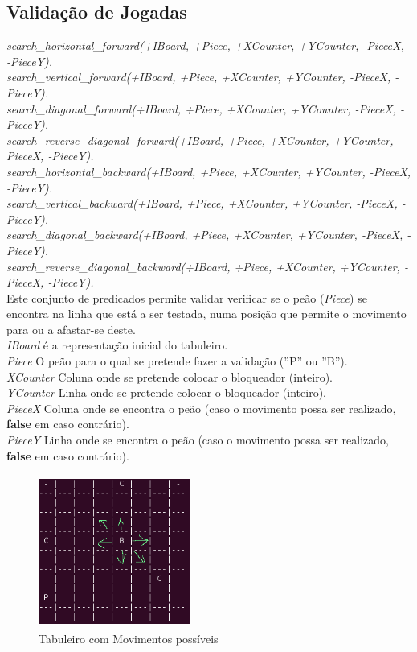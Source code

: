 \documentclass[15pt,a4paper]{article}
\begin{document}
\subsection{Validação de Jogadas} 
\textit{search\_horizontal\_forward(+IBoard, +Piece, +XCounter, +YCounter, -PieceX, -PieceY).}\\
\textit{search\_vertical\_forward(+IBoard, +Piece, +XCounter, +YCounter, -PieceX, -PieceY).}\\
\textit{search\_diagonal\_forward(+IBoard, +Piece, +XCounter, +YCounter, -PieceX, -PieceY).}\\
\textit{search\_reverse\_diagonal\_forward(+IBoard, +Piece, +XCounter, +YCounter, -PieceX, -PieceY).}\\
\textit{search\_horizontal\_backward(+IBoard, +Piece, +XCounter, +YCounter, -PieceX, -PieceY).}\\
\textit{search\_vertical\_backward(+IBoard, +Piece, +XCounter, +YCounter, -PieceX, -PieceY).}\\
\textit{search\_diagonal\_backward(+IBoard, +Piece, +XCounter, +YCounter, -PieceX, -PieceY).}\\
\textit{search\_reverse\_diagonal\_backward(+IBoard, +Piece, +XCounter, +YCounter, -PieceX, -PieceY).}\\
Este conjunto de predicados permite validar verificar se o peão (\textit{Piece}) se encontra na linha que está a ser testada, numa posição que permite o movimento para ou a afastar-se deste.\\
\textit{IBoard} é a representação inicial do tabuleiro.\\
\textit{Piece} O peão para o qual se pretende fazer a validação (''P'' ou ''B'').\\
\textit{XCounter} Coluna onde se pretende colocar o bloqueador (inteiro).\\
\textit{YCounter} Linha onde se pretende colocar o bloqueador (inteiro).\\
\textit{PieceX} Coluna onde se encontra o peão (caso o movimento possa ser realizado, \textbf{false} em caso contrário).\\
\textit{PieceY} Linha  onde se encontra o peão (caso o movimento possa ser realizado, \textbf{false} em caso contrário).\\
\begin{figure}[h!]
\begin{center}
\includegraphics[height=5cm,width=5cm]{tabuleiro_movimento.png}
\caption{Tabuleiro com Movimentos possíveis}
\label{fig:tabuleiro_movimento}
\end{center}
\end{figure}
\end{document}
